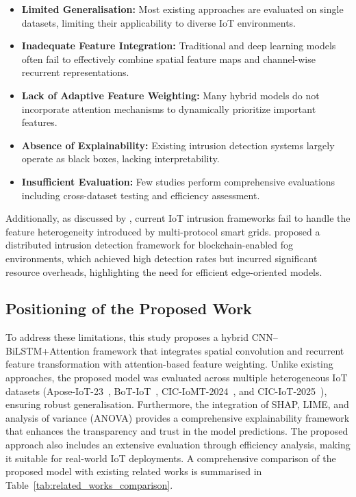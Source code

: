 \documentclass[a4paper,fleqn]{cas-sc}
\begin{document}
\begin{itemize}
    \item \textbf{Limited Generalisation:} Most existing approaches are evaluated on single datasets, limiting their applicability to diverse IoT environments.
    
    \item \textbf{Inadequate Feature Integration:} Traditional and deep learning models often fail to effectively combine spatial feature maps and channel-wise recurrent representations.
    
    \item \textbf{Lack of Adaptive Feature Weighting:} Many hybrid models do not incorporate attention mechanisms to dynamically prioritize important features.
    
    \item \textbf{Absence of Explainability:} Existing intrusion detection systems largely operate as black boxes, lacking interpretability.
    
    \item \textbf{Insufficient Evaluation:} Few studies perform comprehensive evaluations including cross-dataset testing and efficiency assessment.
\end{itemize}

Additionally, as discussed by \cite{sgouras2022detecting}, current IoT intrusion frameworks fail to handle the feature heterogeneity introduced by multi-protocol smart grids. \cite{kumar2021eddos} proposed a distributed intrusion detection framework for blockchain-enabled fog environments, which achieved high detection rates but incurred significant resource overheads, highlighting the need for efficient edge-oriented models.

\subsection{Positioning of the Proposed Work}

To address these limitations, this study proposes a hybrid CNN--BiLSTM+Attention framework that integrates spatial convolution and recurrent feature transformation with attention-based feature weighting. Unlike existing approaches, the proposed model was evaluated across multiple heterogeneous IoT datasets (Apose-IoT-23~\citep{pecorella2021iot}, BoT-IoT~\citep{moustafa2015bot}, CIC-IoMT-2024~\citep{iomt2024dataset}, and CIC-IoT-2025~\citep{ciciot2025dataset}), ensuring robust generalisation. Furthermore, the integration of SHAP, LIME, and analysis of variance (ANOVA) provides a comprehensive explainability framework that enhances the transparency and trust in the model predictions. The proposed approach also includes an extensive evaluation through efficiency analysis, making it suitable for real-world IoT deployments. A comprehensive comparison of the proposed model with existing related works is summarised in Table~\ref{tab:related_works_comparison}.
\end{document}
